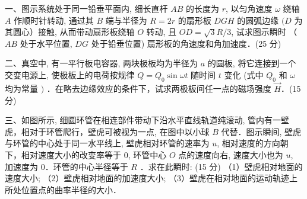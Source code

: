
一、图示系统处于同一铅垂平面内, 细长直杆 $A B$ 的长度为 $r$, 以匀角速度 $\omega$ 绕轴 $A$ 作顺时针转动, 通过其 $B$ 端与半径为 $R=2 r$ 的扇形板 $D G H$ 的圆弧边缘 $(D$ 为其圆心）接触, 从而带动扇形板绕轴 $O$ 转动, 且 $O D=\sqrt{3} R / 3$, 试求图示瞬时 （ $A B$ 处于水平位置, $D G$ 处于铅垂位置) 扇形板的角速度和角加速度．(25 分)

二、真空中, 有一平行板电容器, 两块极板均为半径为 $a$ 的圆板, 将它连接到一个交变电源上, 使极板上的电荷按规律 $Q=Q_{0} \sin \omega t$ 随时间 $t$ 变化 (式中 $Q_{0}$ 和 $\omega$ 均为常量 $)$ ．在略去边缘效应的条件下，试求两极板间任一点的磁场强度 $\vec{H}$．(15 分)

三、如图所示, 细圆环管在相连部件带动下沿水平直线轨道纯滚动, 管内有一壁虎，相对于环管爬行，壁虎可被视为一点, 在图中以小球 $B$ 代替．图示瞬间, 壁虎与环管的中心处于同一水平线上, 壁虎相对环管的速率为 $u$, 相对速度的方向朝下，相对速度大小的改变率等于 $0$, 环管中心 $O$ 点的速度向右, 速度大小也为 $u$, 加速度为 $0$．环管的中心半径等于 $R$ ．求在此瞬时:
(15 分)
（1）壁虎相对地面的速度大小;
（2）壁虎相对地面的加速度大小;
（3）壁虎在相对地面的运动轨迹上所处位置点的曲率半径的大小．